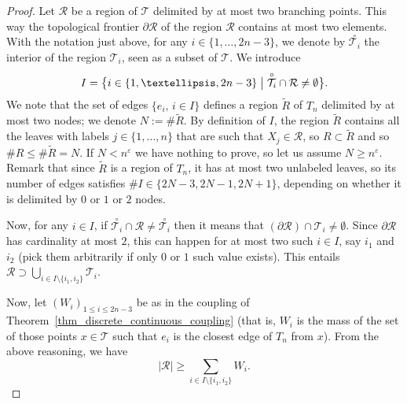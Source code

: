 \documentclass[11pt]{article}
\newcommand{\benstq}[2]{\bigl\{#1\bigm|#2\bigr\}}
\newcommand{\Tt}{\mathcal{T}}
\newcommand{\Rr}{\mathcal{R}}
\let\eps\varepsilon
\theoremstyle{plain}
\theoremstyle{definition}
\numberwithin{equation}{section}
\begin{document}
\begin{proof}
Let $\Rr$ be a region of $\Tt$ delimited by at most two branching points.
This way the topological frontier $\partial \Rr$ of the region $\Rr$ contains at most two elements.
With the notation just above, for any $i\in\{1,\dots,2n-3\}$, we denote by $\overset{\circ}{\Tt_i}$ the interior of the region $\Tt_i$, seen as a subset of $\Tt$.
We introduce
\begin{align*}
I=\benstq{i\in \{1,\dots,2n-3\}}{\overset{\circ}{\Tt_i} \cap \Rr \neq \emptyset }.
\end{align*}
We note that the set of edges $\{e_i,\, i\in I\}$ defines a region $\tilde{R}$ of $T_n$ delimited by at most two nodes; we denote $N:=\#\tilde{R}$.
By definition of $I$, the region $\tilde{R}$ contains all the leaves with labels $j \in \{1,\dots,n\}$ that are such that $X_j \in \Rr$, so $R\subset \tilde{R}$ and so $\#R\leq \#\tilde{R}=N$.
If $N<n^\eps$ we have nothing to prove, so let us assume $N \geq n^{\eps}$.
Remark that since $\tilde{R}$ is a region of $T_n$, it has at most two unlabeled leaves, so its number of edges satisfies $\#I\in \{2N-3,2N-1,2N+1\}$, depending on whether it is delimited by $0$ or $1$ or $2$ nodes.

Now, for any $i\in I$, if $\overset{\circ}{\Tt_i} \cap \Rr \neq \overset{\circ}{\Tt_i}$ then it means that $(\partial \Rr)\cap \Tt_i \neq \emptyset$.
Since $\partial \Rr$ has cardinality at most $2$, this can happen for at most two such $i\in I$, say $i_1$ and $i_2$ (pick them arbitrarily if only $0$ or $1$ such value exists).
This entails $\Rr\supset \bigcup_{i\in I \setminus \{i_1,i_2\}} \Tt_i$.

Now, let $(W_i)_{1\leq i \leq 2n-3}$ be as in the coupling of Theorem~\ref{thm_discrete_continuous_coupling} (that is, $W_i$ is the mass of the set of those points $x \in \Tt$ such that $e_i$ is the closest edge of $T_n$ from $x$).
From the above reasoning, we have
\begin{equation}\label{eqn:mass_region_and_W}
\left| \Rr \right|\geq \sum_{i \in I\setminus\{i_1,i_2\}} W_i.
\end{equation}


\end{proof}
\end{document}
